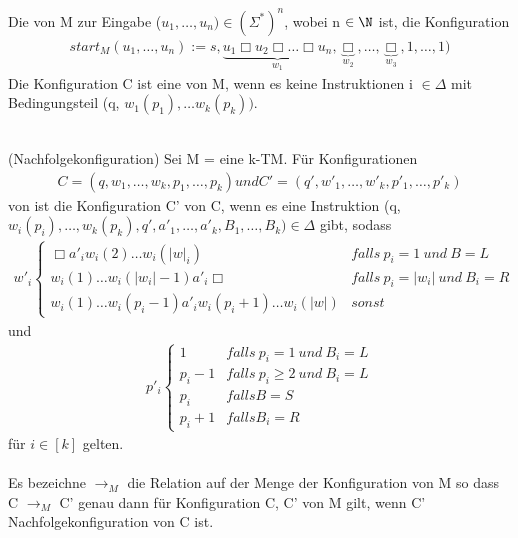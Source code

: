 \documentclass[a4paper]{article}
\begin{document}
Die  von M zur Eingabe ($u_1,\dots,u_n) \in (\Sigma^*)^n$, wobei n $\in \N$ ist, die Konfiguration
\begin{align*}
 start_M (u_1,\dots,u_n) := s, \underbrace{u_1 \Box u_2 \Box \dots \Box u_n}_{w_1}, \underbrace{\Box}_{w_2} , \dots, \underbrace{\Box}_{w_3}, 1, \dots, 1)
\end{align*}
Die Konfiguration C ist eine  von M, wenn es keine Instruktionen i $\in \Delta$ mit Bedingungsteil (q, $w_1(p_1),\dots w_k(p_k))$. \\
\\
\begin{DefBox}{(Nachfolgekonfiguration)}
Sei M = \TM eine k-TM. Für Konfigurationen
\begin{align*}
 C = (q,w_1,\dots,w_k,p_1,\dots,p_k) und C' = (q',w'_1,\dots,w'_k,p'_1,\dots,p'_k)
\end{align*}
von ist die Konfiguration C'  von C, wenn es eine Instruktion (q, $w_i(p_i), \dots, w_k(p_k), q', a'_1, \dots, a'_k, B_1, \dots, B_k) \in \Delta$ gibt, sodass
\begin{align*}
 w'_i \begin{cases}
        \Box a'_i w_i (2) \dots w_i(|w|_i) & falls \ p_i = 1 \ und \ B = L \\
        w_i(1) \dots w_i(|w_i|-1) a'_i \Box & falls \ p_i = |w_i| \ und \ B_i = R \\
        w_i(1) \dots w_i(p_i - 1) a'_i w_i(p_i + 1) \dots w_i (|w|) & sonst
      \end{cases}
\end{align*}
und
\begin{align*}
 p'_i \begin{cases}
        1 & falls \ p_i = 1 \ und \ B_i = L \\
        p_i - 1 & falls \ p_i \geq 2 \ und \ B_i = L \\
        p_i & falls B = S \\
        p_i + 1 & falls B_i = R
      \end{cases}
\end{align*}
für $i \in [k]$ gelten. \\
\\
Es bezeichne $\rightarrow_M$ die Relation auf der Menge der Konfiguration von M so dass C $\rightarrow_M$ C' genau dann für Konfiguration C, C' von M gilt, wenn C' Nachfolgekonfiguration von C ist.
\end{DefBox}
\end{document}
